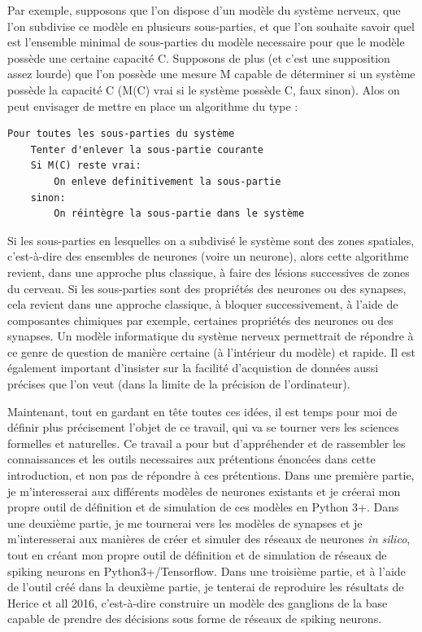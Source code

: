 \documentclass[12pt]{scrartcl}
\begin{document}
\begin{enumerate}
Par exemple, supposons que l'on dispose d'un modèle du système nerveux, que l'on subdivise ce modèle en plusieurs sous-parties, et que l'on souhaite savoir quel est l'ensemble minimal de sous-parties du modèle necessaire pour que le modèle possède une certaine capacité C. Supposons de plus (et c'est une supposition assez lourde) que l'on possède une mesure M capable de déterminer si un système possède la capacité C (M(C) vrai si le système possède C, faux sinon). Alos on peut envisager de mettre en place un algorithme du type :  
\begin{verbatim}
Pour toutes les sous-parties du système  
    Tenter d'enlever la sous-partie courante 
    Si M(C) reste vrai:  
        On enleve definitivement la sous-partie  
    sinon:  
        On réintègre la sous-partie dans le système
\end{verbatim}
		Si les sous-parties en lesquelles on a subdivisé le système sont des zones spatiales, c'est-à-dire des ensembles de neurones (voire un neurone), alors cette algorithme revient, dans une approche plus classique, à faire des lésions successives de zones du cerveau. Si les sous-parties sont des propriétés des neurones ou des synapses, cela revient dans une approche classique, à bloquer successivement, à l'aide de composantes chimiques par exemple, certaines propriétés des neurones ou des synapses.  
Un modèle informatique du système nerveux permettrait de répondre à ce genre de question de manière certaine (à l'intérieur du modèle) et rapide. Il est également important d'insister sur la facilité d'acquistion de données aussi précises que l'on veut (dans la limite de la précision de l'ordinateur). \end{enumerate}

	Maintenant, tout en gardant en tête toutes ces idées, il est temps pour moi de définir plus précisement l'objet de ce travail, qui va se tourner vers les sciences formelles et naturelles. Ce travail a pour but d'appréhender et de rassembler les connaissances et les outils necessaires aux prétentions énoncées dans cette introduction, et non pas de répondre à ces prétentions. 
	Dans une première partie, je m'interesserai aux différents modèles de neurones existants et je créerai mon propre outil de définition et de simulation de ces modèles en Python 3+. Dans une deuxième partie, je me tournerai vers les modèles de synapses et je m'interesserai aux manières de créer et simuler des réseaux de neurones \textit{in silico}, tout en créant mon propre outil de définition et de simulation de réseaux de spiking neurons en Python3+/Tensorflow. Dans une troisième partie, et à l'aide de l'outil créé dans la deuxième partie, je tenterai de reproduire les résultats de Herice et all 2016, c'est-à-dire construire un modèle des ganglions de la base capable de prendre des décisions sous forme de réseaux de spiking neurons.
	
\end{document}
